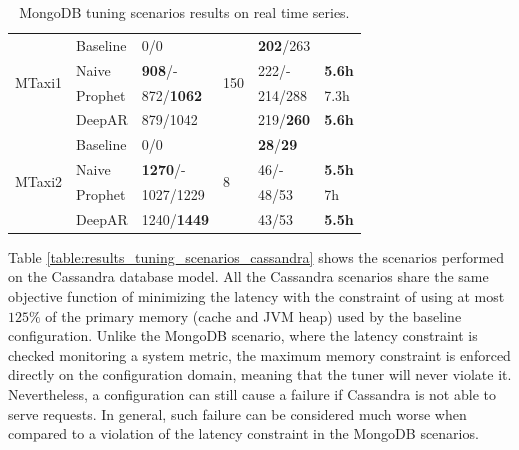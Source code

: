 \documentclass[a4paper, 12pt]{article} %
\begin{document}
\begin{table}
\begin{tabularx}{\textwidth}{@{}XXXXXX@{}}
			\midrule
			\multirow{4}{*}{MTaxi1}
			& Baseline & 0/0 & \multirow{4}{*}{150} & \textbf{202}/263 & \\
			& Naive & \textbf{908}/- && 222/- & \textbf{5.6h} \\
			& Prophet & 872/\textbf{1062} && 214/288 & 7.3h\\
			& DeepAR & 879/1042 && 219/\textbf{260} & \textbf{5.6h}\\
			
			\midrule
			\multirow{4}{*}{MTaxi2}
			& Baseline & 0/0 & \multirow{4}{*}{8} & \textbf{28}/\textbf{29} & \\
			& Naive & \textbf{1270}/- && 46/- & \textbf{5.5h} \\
			& Prophet & 1027/1229 && 48/53 & 7h\\
			& DeepAR & 1240/\textbf{1449} && 43/53 & \textbf{5.5h}\\
			
			
			\bottomrule
		\end{tabularx}
		\caption{MongoDB tuning scenarios results on real time series.} \label{table:results_mongo_real}
	\end{table}
	
	
	Table \ref{table:results_tuning_scenarios_cassandra} shows the scenarios performed on the Cassandra database model. All the Cassandra scenarios share the same objective function of minimizing the latency with the constraint of using at most $125\%$ of the primary memory (cache and JVM heap) used by the baseline configuration. Unlike the MongoDB scenario, where the latency constraint is checked monitoring a system metric, the maximum memory constraint is enforced directly on the configuration domain, meaning that the tuner will never violate it. Nevertheless, a configuration can still cause a failure if Cassandra is not able to serve requests. In general, such failure can be considered much worse when compared to a violation of the latency constraint in the MongoDB scenarios.
	
\end{document}
